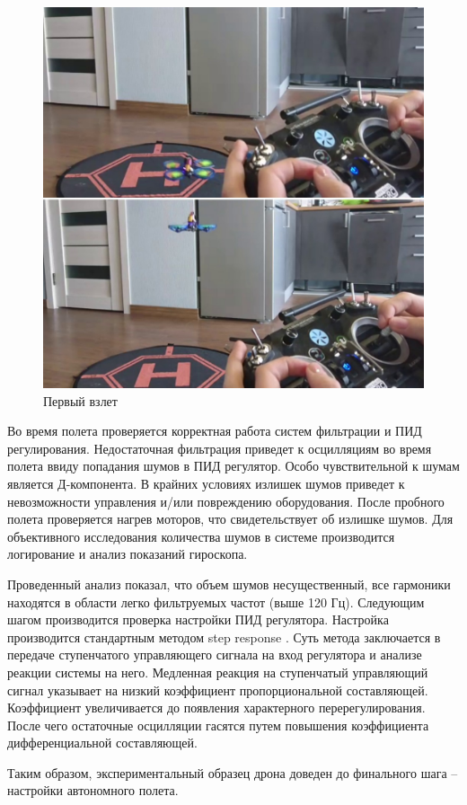 \begin{figure}[H]
	\centering
	\includegraphics[width=0.5\linewidth]{pics/takeoff}
	\caption{ Первый взлет
	}
	\label{fig:takeoff}
\end{figure}

Во время полета проверяется корректная работа систем фильтрации и ПИД регулирования. Недостаточная фильтрация приведет к осцилляциям во время полета ввиду попадания шумов в ПИД регулятор. Особо чувствительной к шумам является Д-компонента. В крайних условиях излишек шумов приведет к невозможности управления и/или повреждению оборудования. После пробного полета проверяется нагрев моторов, что свидетельствует об излишке шумов.
Для объективного исследования количества шумов в системе производится логирование и анализ показаний гироскопа.

Проведенный анализ показал, что объем шумов несущественный, все гармоники находятся в области  легко фильтруемых частот (выше 120 Гц). Следующим шагом производится проверка настройки ПИД регулятора. Настройка производится стандартным методом step response \cite{tau}. Суть метода заключается в передаче ступенчатого управляющего сигнала на вход регулятора и анализе реакции системы на него.
Медленная реакция на ступенчатый управляющий сигнал указывает на низкий коэффициент пропорциональной составляющей.
Коэффициент увеличивается до появления характерного перерегулирования.
После чего остаточные осцилляции гасятся путем повышения коэффициента дифференциальной составляющей.

Таким образом, экспериментальный образец дрона доведен до финального шага -- настройки автономного полета.